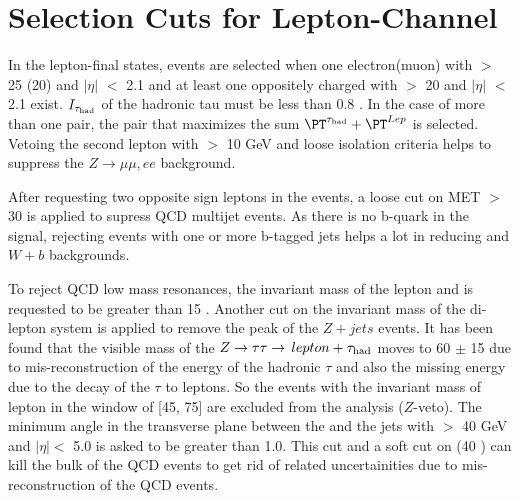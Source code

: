 \section{\texorpdfstring{Selection Cuts for Lepton-\Tau Channel}{Selection Cuts for Lepton-Tau Channel}}
\label{sect:eleTauCuts}

In the lepton-\Tau final states, events are selected when one electron(muon) with \PT $>$ 25 (20) \GeV and $|\eta|$ $<$ 2.1 and at least 
one oppositely charged \Tau with \PT $>$ 20 \GeV and $|\eta|$ $<$ 2.1 exist. $I_{\tau_{\rm had}}$ of the hadronic tau must be less than 0.8 \GeV.
In the case of more than one pair, the pair that maximizes the sum $\PT^{\Tau} + \PT^{Lep}$ is selected.
Vetoing the second lepton with \PT $>$ 10 GeV and loose isolation criteria helps to suppress the $Z\rightarrow \mu\mu, ee$ background.

After requesting two opposite sign leptons in the events, a loose cut on MET $>$ 30 \GeV is applied to supress QCD multijet events. 
As there is no b-quark in the signal, rejecting events with one or more b-tagged jets helps a lot in reducing \ttbar and $W+b$ backgrounds.

To reject QCD low mass resonances, the invariant mass of the lepton and \Tau is requested to be greater than 15 \GeV. 
Another cut on the invariant mass of the di-lepton system is applied to remove the peak of the $Z+jets$ events. 
It has been found that the visible mass of the $Z\to\tau\tau\to\,lepton +\tau_{\rm had}$ moves to 60 $\pm$ 15 \GeV due to 
mis-reconstruction of the energy of the hadronic $\tau$ and also the missing energy due to the decay of the $\tau$ to leptons. 
So the events with the invariant mass of lepton \Tau in the window of [45, 75] are excluded from the analysis ($Z$-veto). 
The minimum angle in the transverse plane between the \MET and the jets with \PT $>$ 40 GeV and $|\eta| <$ 5.0 
is asked to be greater than 1.0. This cut and a soft cut on \mttwo (40 \GeV) can kill the bulk of the QCD events 
to get rid of related uncertainities due to mis-reconstruction of the QCD events. 


